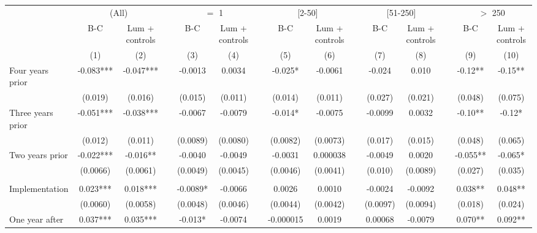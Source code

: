 \begin{tabular}{lcccccccccccccc}
\toprule
      & \multicolumn{2}{c}{(All)} &       & \multicolumn{2}{c}{$=$ 1} &       & \multicolumn{2}{c}{[2-50]} &       & \multicolumn{2}{c}{[51-250]} &       & \multicolumn{2}{c}{$>$ 250} \\
\cmidrule{2-3}\cmidrule{5-6}\cmidrule{8-9}\cmidrule{11-12}\cmidrule{14-15}      & B-C   & Lum + controls &       & B-C   & Lum + controls &       & B-C   & Lum + controls &       & B-C   & Lum + controls &       & B-C   & Lum + controls \\
\midrule
      & (1)   & (2)   &       & (3)   & (4)   &       & (5)   & (6)   &       & (7)   & (8)   &       & (9)   & (10) \\
\midrule
\midrule
Four years prior & -0.083*** & -0.047*** &       & -0.0013 & 0.0034 &       & -0.025* & -0.0061 &       & -0.024 & 0.010 &       & -0.12** & -0.15** \\
      & (0.019) & (0.016) &       & (0.015) & (0.011) &       & (0.014) & (0.011) &       & (0.027) & (0.021) &       & (0.048) & (0.075) \\
Three years prior & -0.051*** & -0.038*** &       & -0.0067 & -0.0079 &       & -0.014* & -0.0075 &       & -0.0099 & 0.0032 &       & -0.10** & -0.12* \\
      & (0.012) & (0.011) &       & (0.0089) & (0.0080) &       & (0.0082) & (0.0073) &       & (0.017) & (0.015) &       & (0.048) & (0.065) \\
Two years prior & -0.022*** & -0.016** &       & -0.0040 & -0.0049 &       & -0.0031 & 0.000038 &       & -0.0049 & 0.0020 &       & -0.055** & -0.065* \\
      & (0.0066) & (0.0061) &       & (0.0049) & (0.0045) &       & (0.0046) & (0.0041) &       & (0.010) & (0.0089) &       & (0.027) & (0.035) \\
      &       &       &       &       &       &       &       &       &       &       &       &       &       &  \\
Implementation & 0.023*** & 0.018*** &       & -0.0089* & -0.0066 &       & 0.0026 & 0.0010 &       & -0.0024 & -0.0092 &       & 0.038** & 0.048** \\
      & (0.0060) & (0.0058) &       & (0.0048) & (0.0046) &       & (0.0044) & (0.0042) &       & (0.0097) & (0.0094) &       & (0.018) & (0.024) \\
One year after & 0.037*** & 0.035*** &       & -0.013* & -0.0074 &       & -0.000015 & 0.0019 &       & 0.00068 & -0.0079 &       & 0.070** & 0.092** \\

\end{tabular}
